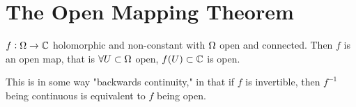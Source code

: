 \section{The Open Mapping Theorem}

\begin{theorem}
$f:\Omega \rightarrow \mathbb{C}$ holomorphic and non-constant with $\Omega$ open and connected. Then $f$ is an open map, that is $\forall U \subset \Omega$ open, $f(U) \subset \mathbb{C}$ is open.
\end{theorem}


\begin{note}
This is in some way "backwards continuity," in that if $f$ is invertible, then $f^{-1}$ being continuous is equivalent to $f$ being open.
\end{note}

